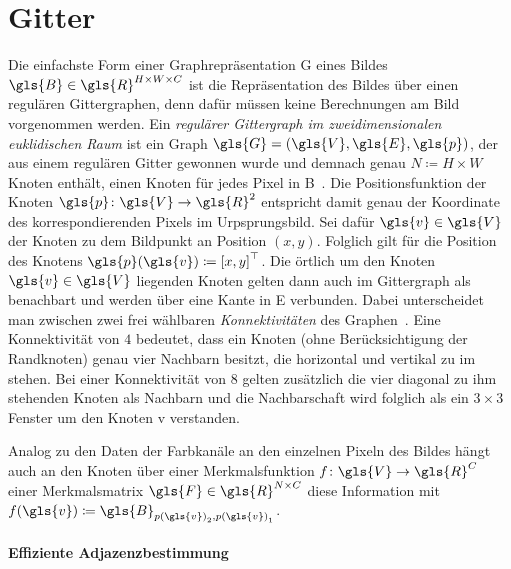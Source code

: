 \section{Gitter}
\label{gitter}

Die einfachste Form einer Graphrepräsentation \gls{G} eines Bildes $\gls{B} \in \gls{R}^{H \times W \times C}$ ist die Repräsentation des Bildes über einen regulären Gittergraphen, denn dafür müssen keine Berechnungen am Bild vorgenommen werden.
Ein \emph{regulärer Gittergraph im zweidimensionalen euklidischen Raum} ist ein Graph $\gls{G} = \left(\gls{V}, \gls{E}, \gls{p}\right)$, der aus einem regulären Gitter gewonnen wurde und demnach genau $N \coloneqq H \times W$ Knoten enthält, \dhe{} einen Knoten für jedes Pixel in \gls{B}~\cite{Defferrard}.
Die Positionsfunktion der Knoten $\gls{p} \colon \gls{V} \to \gls{R}^2$ entspricht damit genau der Koordinate des korrespondierenden Pixels im Urpsprungsbild.
Sei dafür $\gls{v} \in \gls{V}$ der Knoten zu dem Bildpunkt an Position $\left(x,y\right)$.
Folglich gilt für die Position des Knotens $\gls{p}\left(\gls{v}\right) \coloneqq {\left[x,y\right]}^{\top}$.
Die örtlich um den Knoten $\gls{v} \in \gls{V}$ liegenden Knoten gelten dann auch im Gittergraph als benachbart und werden über eine Kante in \gls{E} verbunden.
Dabei unterscheidet man zwischen zwei frei wählbaren \emph{Konnektivitäten} des Graphen~\cite{Defferrard}.
Eine Konnektivität von $4$ bedeutet, dass ein Knoten (ohne Berücksichtigung der Randknoten) genau vier Nachbarn besitzt, die horizontal und vertikal zu im stehen.
Bei einer Konnektivität von $8$ gelten zusätzlich die vier diagonal zu ihm stehenden Knoten als Nachbarn und die Nachbarschaft wird folglich als ein $3 \times 3$ Fenster um den Knoten \gls{v} verstanden.

Analog zu den Daten der Farbkanäle an den einzelnen Pixeln des Bildes hängt auch an den Knoten über einer Merkmalsfunktion $f \colon \gls{V} \to \gls{R}^C$ \bzw{} einer Merkmalsmatrix $\gls{F} \in \gls{R}^{N \times C}$ diese Information mit $f\left(\gls{v}\right) \coloneqq \gls{B}_{{p\left(\gls{v}\right)}_2,{p\left(\gls{v}\right)}_1}$.

\paragraph{Effiziente Adjazenzbestimmung}
\label{adjazenzbestimmung_gitter}


